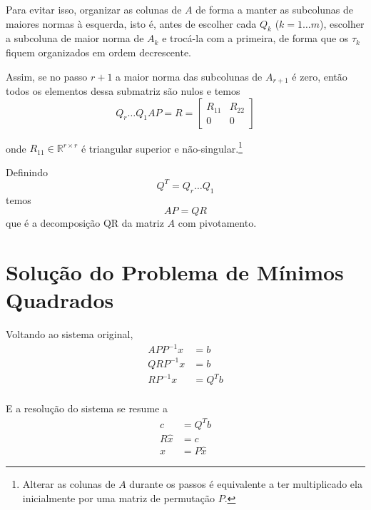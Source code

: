 \documentclass[a4paper,11pt]{article}
\begin{document}
        Para evitar isso, organizar as colunas de $A$ de forma a manter as subcolunas de maiores normas à esquerda, isto é, antes de escolher cada $Q_k$ ($k = 1\dots m$), escolher a subcoluna de maior norma de $A_k$ e trocá-la com a primeira, de forma que os $\tau_k$ fiquem organizados em ordem decrescente.

        Assim, se no passo $r+1$ a maior norma das subcolunas de $A_{r+1}$ é zero, então todos os elementos dessa submatriz são nulos e temos
        $$ Q_r\dots Q_1AP = R =
        \begin{bmatrix}
            R_{11} & R_{22} \\
                 0 &      0
        \end{bmatrix}$$

        onde $R_{11} \in \mathbb{R}^{r\times r}$ é triangular superior e não-singular.\footnote{Alterar as colunas de $A$ durante os passos é equivalente a ter multiplicado ela inicialmente por uma matriz de permutação $P$.}

        Definindo
        $$ Q^T = Q_r \dots Q_1 $$
        temos
        $$ AP = QR $$
        que é a decomposição QR da matriz $A$ com pivotamento.

    \section*{Solução do Problema de Mínimos Quadrados}
        Voltando ao sistema original,
        \begin{align*}
            APP^{-1}x &= b \\
            QRP^{-1}x &= b \\
             RP^{-1}x &= Q^Tb \\
        \end{align*}

        E a resolução do sistema se resume a
        \begin{align*}
            c        &= Q^Tb \\
            R\hat{x} &= c \\
            x        &= P\hat{x}
        \end{align*}
\end{document}
